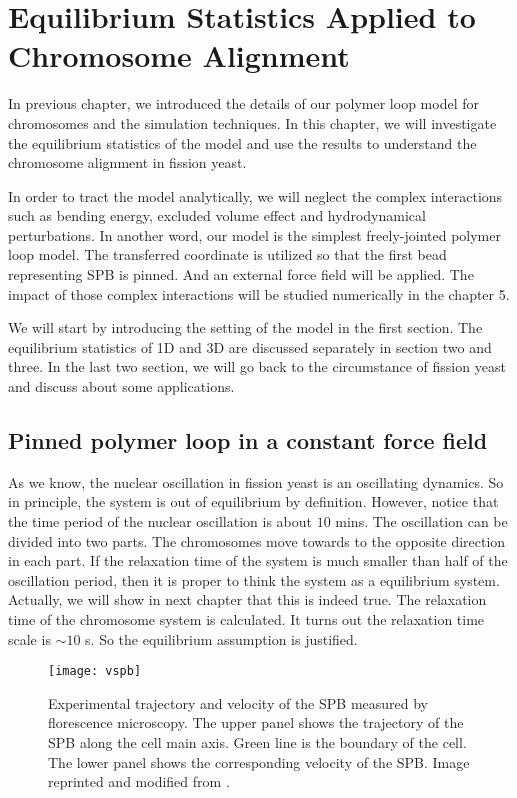 \chapter{Equilibrium Statistics Applied to Chromosome Alignment}
\graphicspath{{Chapter3/Figs/}}

In previous chapter, we introduced the details of our polymer loop model for chromosomes and the simulation techniques. In this chapter, we will investigate the equilibrium statistics of the model and use the results to understand the chromosome alignment in fission yeast. 

In order to tract the model analytically, we will neglect the complex interactions such as bending energy, excluded volume effect and hydrodynamical perturbations. In another word, our model is the simplest freely-jointed polymer loop model. The transferred coordinate is utilized so that the first bead representing SPB is pinned. And an external force field will be applied. The impact of those complex interactions will be studied numerically in the chapter 5. 

We will start by introducing the setting of the model in the first section. The equilibrium statistics of 1D and 3D are discussed separately in section two and three. In the last two section, we will go back to the circumstance of fission yeast and discuss about some applications. 


\section{Pinned polymer loop in a constant force field}
\label{sec:pinned_polymer_loop}
As we know, the nuclear oscillation in fission yeast is an oscillating dynamics. So in principle, the system is out of equilibrium by definition. However, notice that the time period of the nuclear oscillation is about $10$ mins. The oscillation can be divided into two parts. The chromosomes move towards to the opposite direction in each part. If the relaxation time of the system is much smaller than half of the oscillation period, then it is proper to think the system as a equilibrium system. Actually, we will show in next chapter that this is indeed true. The relaxation time of the chromosome system is calculated. It turns out the relaxation time scale is $\sim10$ s. So the equilibrium assumption is justified. 

\begin{figure}[htpb]
    \centering
    \texttt{[image: vspb]}
    \caption{Experimental trajectory and velocity of the SPB measured by florescence microscopy. The upper panel shows the trajectory of the SPB along the cell main axis. Green line is the boundary of the cell. The lower panel shows the corresponding velocity of the SPB. Image reprinted and modified from \cite{Vogel2009}.}
    \label{fig:vspb}
\end{figure}

